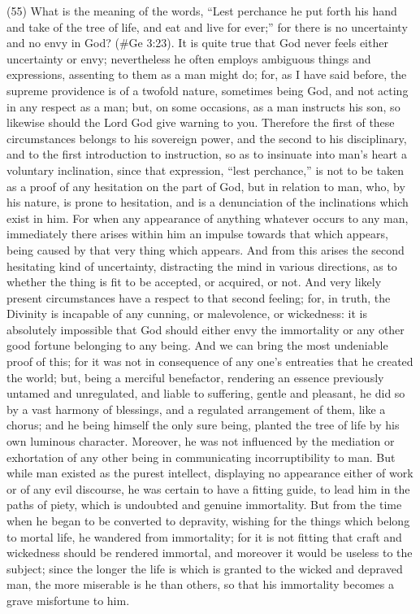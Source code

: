 (55) What is the meaning of the words, ``Lest perchance he put forth his hand and take of the tree
of life, and eat and live for ever;'' for there is no uncertainty and no envy in God? (\#Ge 3:23). It
is quite true that God never feels either uncertainty or envy; nevertheless he often employs
ambiguous things and expressions, assenting to them as a man might do; for, as I have said
before, the supreme providence is of a twofold nature, sometimes being God, and not acting in any
respect as a man; but, on some occasions, as a man instructs his son, so likewise should the Lord
God give warning to you. Therefore the first of these circumstances belongs to his sovereign
power, and the second to his disciplinary, and to the first introduction to instruction, so as to
insinuate into man's heart a voluntary inclination, since that expression, ``lest perchance,'' is not to
be taken as a proof of any hesitation on the part of God, but in relation to man, who, by his nature,
is prone to hesitation, and is a denunciation of the inclinations which exist in him. For when any
appearance of anything whatever occurs to any man, immediately there arises within him an
impulse towards that which appears, being caused by that very thing which appears. And from this
arises the second hesitating kind of uncertainty, distracting the mind in various directions, as to
whether the thing is fit to be accepted, or acquired, or not. And very likely present circumstances
have a respect to that second feeling; for, in truth, the Divinity is incapable of any cunning, or
malevolence, or wickedness: it is absolutely impossible that God should either envy the immortality
or any other good fortune belonging to any being. And we can bring the most undeniable proof of
this; for it was not in consequence of any one's entreaties that he created the world; but, being a
merciful benefactor, rendering an essence previously untamed and unregulated, and liable to
suffering, gentle and pleasant, he did so by a vast harmony of blessings, and a regulated
arrangement of them, like a chorus; and he being himself the only sure being, planted the tree of
life by his own luminous character. Moreover, he was not influenced by the mediation or
exhortation of any other being in communicating incorruptibility to man. But while man existed as
the purest intellect, displaying no appearance either of work or of any evil discourse, he was
certain to have a fitting guide, to lead him in the paths of piety, which is undoubted and genuine
immortality. But from the time when he began to be converted to depravity, wishing for the things
which belong to mortal life, he wandered from immortality; for it is not fitting that craft and
wickedness should be rendered immortal, and moreover it would be useless to the subject; since
the longer the life is which is granted to the wicked and depraved man, the more miserable is he
than others, so that his immortality becomes a grave misfortune to him.

